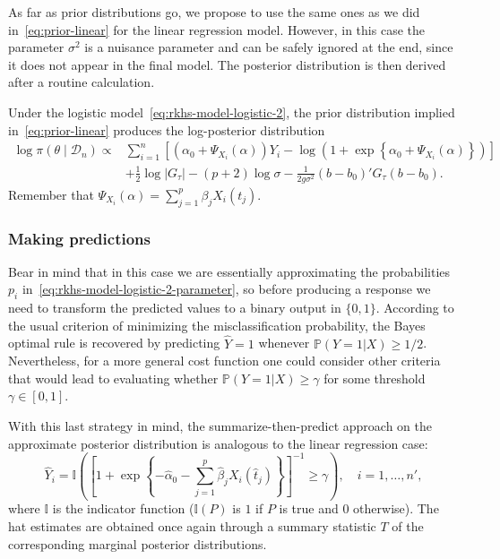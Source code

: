 As far as prior distributions go, we propose to use the same ones as we did in~\eqref{eq:prior-linear} for the linear regression model. However, in this case the parameter \(\sigma^2\) is a nuisance parameter and can be safely ignored at the end, since it does not appear in the final model. The posterior distribution is then derived after a routine calculation.

\begin{proposition}
Under the logistic model~\eqref{eq:rkhs-model-logistic-2}, the prior distribution implied in~\eqref{eq:prior-linear} produces the log-posterior distribution
\begin{align*}
  \log \pi(\theta \mid \mathcal D_n) \propto {} & \sum_{i=1}^n \left[ \left(\alpha_0 + \Psi_{X_i}(\alpha)\right)Y_i - \log\left(1 + \exp\left\{\alpha_0 + \Psi_{X_i}(\alpha)\right\}\right)\right]\\
  \quad &+ \frac{1}{2}\log |G_\tau| - (p+2)\log \sigma -\frac{1}{2g\sigma^2} (b - b_0)'G_\tau(b - b_0).
\end{align*}
Remember that \(\Psi_{X_i}(\alpha) = \sum_{j=1}^p \beta_j X_i(t_j)\).
\end{proposition}

\subsubsection{Making predictions}

Bear in mind that in this case we are essentially approximating the probabilities \(p_i\) in~\eqref{eq:rkhs-model-logistic-2-parameter}, so before producing a response we need to transform the predicted values to a binary output in \(\{0, 1\}\). According to the usual criterion of minimizing the misclassification probability, the Bayes optimal rule is recovered by predicting \(\hat Y=1\) whenever \(\mathbb P(Y=1|X) \geq 1/2\). Nevertheless, for a more general cost function one could consider other criteria that would lead to evaluating whether \(\mathbb P(Y=1|X) \geq \gamma\) for some threshold \(\gamma\in[0, 1]\).

With this last strategy in mind, the summarize-then-predict approach on the approximate posterior distribution is analogous to the linear regression case:
\[
\hat Y_i = \mathbb I \left( \left[\displaystyle 1 + \exp\left\{-\hat\alpha_0 - \sum_{j=1}^p \hat\beta_j X_i(\hat t_j)\right\}\right]^{-1} \geq \gamma \right), \quad i=1,\dots,n',
\]
where \(\mathbb I\) is the indicator function (\(\mathbb I(P)\) is \(1\) if \(P\) is true and \(0\) otherwise). The hat estimates are obtained once again through a summary statistic \(T\) of the corresponding marginal posterior distributions.

